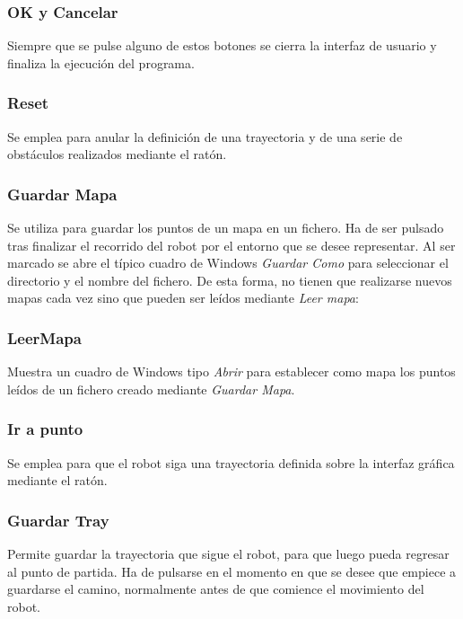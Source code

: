 \subsubsection{OK y Cancelar}

\noindent
Siempre que se pulse alguno de estos botones se cierra la interfaz de usuario y finaliza la ejecución del programa.

\subsubsection{Reset}
\noindent
Se emplea para anular la definición de una trayectoria y de una serie de obstáculos realizados mediante el ratón.

\subsubsection{Guardar Mapa}

\noindent
Se utiliza para guardar los puntos de un mapa en un fichero. Ha de ser pulsado tras finalizar el recorrido del robot por el entorno que se desee representar. Al ser marcado se abre el típico cuadro de Windows \emph{Guardar Como} para seleccionar el directorio y el nombre del fichero. De esta forma, no tienen que realizarse nuevos mapas cada vez sino que pueden ser leídos mediante \emph{Leer mapa}:

\subsubsection{LeerMapa}

\noindent
Muestra un cuadro de Windows tipo \emph{Abrir} para establecer como mapa los puntos leídos de un fichero creado mediante \emph{Guardar Mapa}.

\subsubsection{Ir a punto}

\noindent
Se emplea para que el robot siga una trayectoria definida sobre la interfaz gráfica mediante el ratón.

\subsubsection{Guardar Tray}

\noindent
Permite guardar la trayectoria que sigue el robot, para que luego pueda regresar al punto de partida. Ha de pulsarse en el momento en que se desee que empiece a guardarse el camino, normalmente antes de que comience el movimiento del robot.

